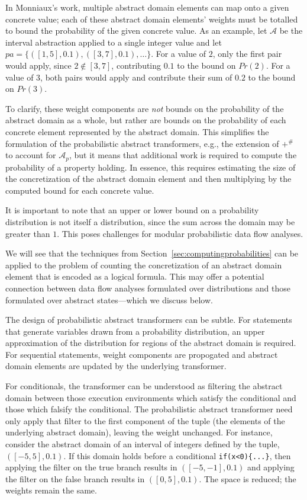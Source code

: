 In Monniaux's work, multiple abstract domain elements can map onto a given
concrete value; each of these abstract domain elements'
weights must be totalled to bound the probability of
the given concrete value.
As an example, let $\mathcal{A}$ be the interval abstraction
applied to a single integer value
and let $pa = \{([1,5],0.1),([3,7],0.1),\ldots\}$.  
For a value of $2$, only the first pair would apply, since
$2 \not\in [3,7]$, contributing $0.1$ to the bound on $Pr(2)$.
For a value of $3$, both pairs would apply and contribute
their sum of $0.2$ to the bound on $Pr(3)$.

To clarify, these weight components are \textit{not} bounds on the probability
of the abstract domain as a whole, but rather are bounds on the probability
of each concrete element represented by the abstract domain.
This simplifies the formulation of the probabilistic abstract
transformers, e.g., the extension of $+^\#$
to account for $\mathcal{A}_p$, but it means that additional
work is required to compute the probability of a property holding.
In essence, this requires estimating the size of the concretization
of the abstract domain element and then multiplying by the computed bound for
each concrete value.  

It is important to note that an upper or lower
bound on a probability distribution
is not itself a distribution, since the sum across the domain
may be greater than $1$.
This poses challenges for modular probabilistic data flow analyses.

We will see that the techniques from 
Section~\ref{sec:computingprobabilities} can be applied to
the problem of counting the concretization of an abstract domain element 
that is encoded as a logical formula.  This may offer a potential
connection between data flow analyses formulated over distributions
and those formulated over abstract states---which we discuss below.

The design of probabilistic abstract transformers can be subtle.
For statements that generate variables drawn from a probability
distribution, an upper approximation of the distribution for
regions of the abstract domain is required.  
For sequential statements, weight components are propogated
and abstract domain elements are updated by the underlying transformer.

For conditionals, the transformer can be understood
as filtering the abstract domain between those execution environments which
satisfy the conditional and those which falsify the conditional. 
The probabilistic abstract transformer need only apply
that filter to the first component of
the tuple (the elements of the underlying abstract domain), 
leaving the weight unchanged.
For instance, consider the abstract domain of an interval of 
integers defined by the tuple, $([-5,5],0.1)$. 
If this domain holds before a conditional 
{\tt if(x<0)\{...\}}, then applying the filter on the true branch
results in $([-5,-1],0.1)$ and 
applying the filter on the false branch results in $([0,5],0.1)$.
The space is reduced; the weights remain the same.

